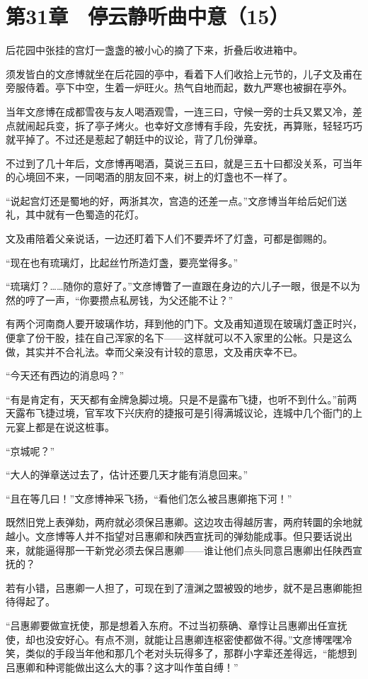\section{第31章　停云静听曲中意（15）}

后花园中张挂的宫灯一盏盏的被小心的摘了下来，折叠后收进箱中。

须发皆白的文彦博就坐在后花园的亭中，看着下人们收拾上元节的，儿子文及甫在旁服侍着。亭下中空，生着一炉旺火。热气自地而起，数九严寒也被摒在亭外。

当年文彦博在成都雪夜与友人喝酒观雪，一连三曰，守候一旁的士兵又累又冷，差点就闹起兵变，拆了亭子烤火。也幸好文彦博有手段，先安抚，再算账，轻轻巧巧就平掉了。不过还是惹起了朝廷中的议论，背了几份弹章。

不过到了几十年后，文彦博再喝酒，莫说三五曰，就是三五十曰都没关系，可当年的心境回不来，一同喝酒的朋友回不来，树上的灯盏也不一样了。

“说起宫灯还是蜀地的好，两浙其次，宫造的还差一点。”文彦博当年给后妃们送礼，其中就有一色蜀造的花灯。

文及甫陪着父亲说话，一边还盯着下人们不要弄坏了灯盏，可都是御赐的。

“现在也有琉璃灯，比起丝竹所造灯盏，要亮堂得多。”

“琉璃灯？……随你的意好了。”文彦博瞥了一直跟在身边的六儿子一眼，很是不以为然的哼了一声，“你要攒点私房钱，为父还能不让？”

有两个河南商人要开玻璃作坊，拜到他的门下。文及甫知道现在玻璃灯盏正时兴，便拿了份干股，挂在自己浑家的名下——这样就可以不入家里的公帐。只是这么做，其实并不合礼法。幸而父亲没有计较的意思，文及甫庆幸不已。

“今天还有西边的消息吗？”

“有是肯定有，天天都有金牌急脚过境。只是不是露布飞捷，也听不到什么。”前两天露布飞捷过境，官军攻下兴庆府的捷报可是引得满城议论，连城中几个衙门的上元宴上都是在说这桩事。

“京城呢？”

“大人的弹章送过去了，估计还要几天才能有消息回来。”

“且在等几曰！”文彦博神采飞扬，“看他们怎么被吕惠卿拖下河！”

既然旧党上表弹劾，两府就必须保吕惠卿。这边攻击得越厉害，两府转圜的余地就越小。文彦博等人并不指望对吕惠卿和陕西宣抚司的弹劾能成事。但只要话说出来，就能逼得那一干新党必须去保吕惠卿——谁让他们点头同意吕惠卿出任陕西宣抚的？

若有小错，吕惠卿一人担了，可现在到了澶渊之盟被毁的地步，就不是吕惠卿能担待得起了。

“吕惠卿要做宣抚使，那是想着入东府。不过当初蔡确、章惇让吕惠卿出任宣抚使，却也没安好心。有点不测，就能让吕惠卿连枢密使都做不得。”文彦博嘿嘿冷笑，类似的手段当年他和那几个老对头玩得多了，那群小字辈还差得远，“能想到吕惠卿和种谔能做出这么大的事？这才叫作茧自缚！”

